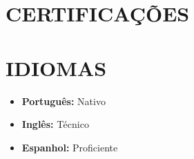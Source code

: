 \documentclass[11pt]{article}
\begin{document}
\section{CERTIFICAÇÕES}


\section{IDIOMAS}
\begin{itemize}[leftmargin=1em, itemsep=0.05em, topsep=0.1em]
    \item \textbf{Português:} Nativo
    \item \textbf{Inglês:} Técnico
    \item \textbf{Espanhol:} Proficiente
\end{itemize}
\end{document}
